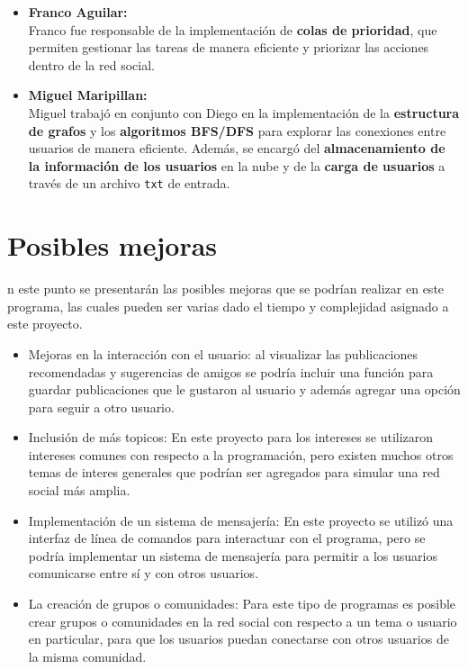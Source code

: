 \documentclass[9pt,letterpaper,onecolumn]{rho-class/rho}
\begin{document}
\begin{itemize}
        \item \textbf{Franco Aguilar:} \\
        Franco fue responsable de la implementación de \textbf{colas de prioridad}, que permiten gestionar las tareas de manera eficiente y priorizar las acciones dentro de la red social.
    
        \item \textbf{Miguel Maripillan:} \\
        Miguel trabajó en conjunto con Diego en la implementación de la \textbf{estructura de grafos} y los \textbf{algoritmos BFS/DFS} para explorar las conexiones entre usuarios de manera eficiente. Además, se encargó del \textbf{almacenamiento de la información de los usuarios} en la nube y de la \textbf{carga de usuarios} a través de un archivo \texttt{txt} de entrada.
    \end{itemize}


\newpage
\section{Posibles mejoras}

    n este punto se presentarán las posibles mejoras que se podrían realizar en este programa, las cuales pueden ser varias dado el tiempo y complejidad asignado a este proyecto.

    \begin{itemize}
        \item Mejoras en la interacción con el usuario: al visualizar las publicaciones recomendadas y sugerencias de amigos se podría incluir una función para guardar publicaciones que le gustaron al usuario y además agregar una opción para seguir a otro usuario.
        \vspace{0.3cm}
        \item Inclusión de más topicos: En este proyecto para los intereses se utilizaron intereses comunes con respecto a la programación, pero existen muchos otros temas de interes generales que podrían ser agregados para simular una red social más amplia.
        \vspace{0.3cm}
        \item Implementación de un sistema de mensajería: En este proyecto se utilizó una interfaz de línea de comandos para interactuar con el programa, pero se podría implementar un sistema de mensajería para permitir a los usuarios comunicarse entre sí y con otros usuarios.
        \vspace{0.3cm}
        \item La creación de grupos o comunidades: Para este tipo de programas es posible crear grupos o comunidades en la red social con respecto a un tema o usuario en particular, para que los usuarios puedan conectarse con otros usuarios de la misma comunidad.
    \end{itemize}
\end{document}
